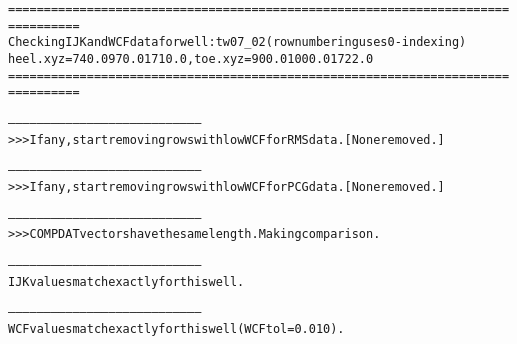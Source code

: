 \begin{alltt}
================================================================================
Checking IJK and WCF data for well: tw07_02 (row numbering uses 0-indexing)
heel.xyz = 740.0 970.0 1710.0, toe.xyz = 900.0 1000.0 1722.0
================================================================================

--------------------------------------------------------------------------------
>>> If any, start removing rows with low WCF for RMS data. [None removed.]

--------------------------------------------------------------------------------
>>> If any, start removing rows with low WCF for PCG data. [None removed.]

--------------------------------------------------------------------------------
>>> COMPDAT vectors have the same length. Making comparison.

--------------------------------------------------------------------------------
IJK values match exactly for this well.

--------------------------------------------------------------------------------
WCF values match exactly for this well (WCF tol = 0.010).
\end{alltt}
